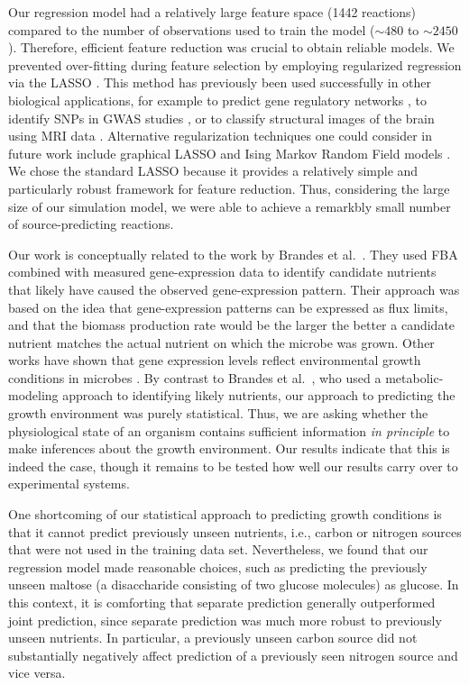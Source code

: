 \documentclass[12pt]{article}
\begin{document}
Our regression model had a relatively large feature space (1442 reactions) compared to the number of observations used to train the model ($\mathord{\sim}480$ to $\mathord{\sim}2450$). Therefore, efficient feature reduction was crucial to obtain reliable models. We prevented over-fitting during feature selection by employing regularized regression via the LASSO \cite{Tibshirani1996}. This method has previously been used successfully in other biological applications, for example to predict gene regulatory networks \cite{Menendezetal2010}, to identify SNPs in GWAS studies \cite{Wuetal2009}, or to classify structural images of the brain using MRI data \cite{Casanovaetal2011,Casanovaetal2012,Wangetal2012}. Alternative regularization techniques one could consider in future work include graphical LASSO \cite{Friedmanetal2008} and Ising Markov Random Field models \cite{Ravikumaretal2010}. We chose the standard LASSO because it provides a relatively simple and particularly robust framework for feature reduction. Thus, considering the large size of our simulation model, we were able to achieve a remarkbly small number of source-predicting reactions.

Our work is conceptually related to the work by Brandes et al.~\cite{Brandesetal2012}. They used FBA combined with measured gene-expression data to identify candidate nutrients that likely have caused the observed gene-expression pattern. Their approach was based on the idea that gene-expression patterns can be expressed as flux limits, and that the biomass production rate would be the larger the better a candidate nutrient matches the actual nutrient on which the microbe was grown. Other works have shown that gene expression levels reflect environmental growth conditions in microbes \cite{Schnappingeretal2003,Baevetal2006}. By contrast to Brandes et al.~\cite{Brandesetal2012}, who used a metabolic-modeling approach to identifying likely nutrients, our approach to predicting the growth environment was purely statistical. Thus, we are asking whether the physiological state of an organism contains sufficient information \emph{in principle} to make inferences about the growth environment. Our results indicate that this is indeed the case, though it remains to be tested how well our results carry over to experimental systems.

One shortcoming of our statistical approach to predicting growth conditions is that it cannot predict previously unseen nutrients, i.e., carbon or nitrogen sources that were not used in the training data set. Nevertheless, we found that our regression model made reasonable choices, such as predicting the previously unseen maltose (a disaccharide consisting of two glucose molecules) as glucose. In this context, it is comforting that separate prediction generally outperformed joint prediction, since separate prediction was much more robust to previously unseen nutrients. In particular, a previously unseen carbon source did not substantially negatively affect prediction of a previously seen nitrogen source and vice versa.
\end{document}
